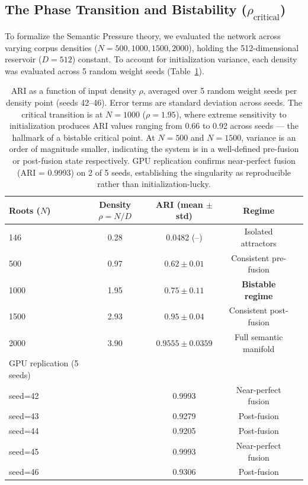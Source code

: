 \documentclass{article}
\begin{document}
\subsection{The Phase Transition and Bistability ($\rho_{\text{critical}}$)}
\label{sec:phase_transition}

To formalize the Semantic Pressure theory, we evaluated the network across varying
corpus densities ($N = 500, 1000, 1500, 2000$), holding the 512-dimensional reservoir
($D = 512$) constant. To account for initialization variance, each density was evaluated
across 5 random weight seeds (Table~\ref{tab:scaling}).

\begin{table}[h]
\centering
\begin{tabular}{lcccc}
\toprule
Roots ($N$) & Density $\rho = N/D$ & ARI (mean $\pm$ std) & Regime \\
\midrule
146 & 0.28 & 0.0482 (--) & Isolated attractors \\
500 & 0.97 & $0.62 \pm 0.01$ & Consistent pre-fusion \\
1000 & 1.95 & $0.75 \pm 0.11$ & \textbf{Bistable regime} \\
1500 & 2.93 & $0.95 \pm 0.04$ & Consistent post-fusion \\
2000 & 3.90 & $\mathbf{0.9555 \pm 0.0359}$ & Full semantic manifold \\
\midrule
GPU replication (5 seeds) & & & \\
\quad seed=42 & & 0.9993 & Near-perfect fusion \\
\quad seed=43 & & 0.9279 & Post-fusion \\
\quad seed=44 & & 0.9205 & Post-fusion \\
\quad seed=45 & & 0.9993 & Near-perfect fusion \\
\quad seed=46 & & 0.9306 & Post-fusion \\
\bottomrule
\end{tabular}
\caption{ARI as a function of input density $\rho$, averaged over 5 random weight
seeds per density point (seeds 42--46). Error terms are standard deviation across
seeds. The critical transition is at $N = 1000$ ($\rho = 1.95$), where extreme
sensitivity to initialization produces ARI values ranging from 0.66 to 0.92 across
seeds — the hallmark of a bistable critical point. At $N = 500$ and $N = 1500$,
variance is an order of magnitude smaller, indicating the system is in a well-defined
pre-fusion or post-fusion state respectively. GPU replication confirms near-perfect fusion
(ARI = 0.9993) on 2 of 5 seeds, establishing the singularity as reproducible
rather than initialization-lucky.}
\label{tab:scaling}
\end{table}
\end{document}
